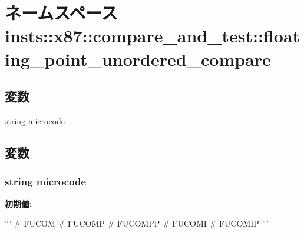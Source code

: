 \hypertarget{namespaceinsts_1_1x87_1_1compare__and__test_1_1floating__point__unordered__compare}{
\section{ネームスペース insts::x87::compare\_\-and\_\-test::floating\_\-point\_\-unordered\_\-compare}
\label{namespaceinsts_1_1x87_1_1compare__and__test_1_1floating__point__unordered__compare}
}
\subsection*{変数}
\begin{DoxyCompactItemize}
\item 
string \hyperlink{namespaceinsts_1_1x87_1_1compare__and__test_1_1floating__point__unordered__compare_a770f11a173e99389a8802f0107ed8f52}{microcode}
\end{DoxyCompactItemize}


\subsection{変数}
\hypertarget{namespaceinsts_1_1x87_1_1compare__and__test_1_1floating__point__unordered__compare_a770f11a173e99389a8802f0107ed8f52}{
\subsubsection[{microcode}]{\setlength{\rightskip}{0pt plus 5cm}string {\bf microcode}}}
\label{namespaceinsts_1_1x87_1_1compare__and__test_1_1floating__point__unordered__compare_a770f11a173e99389a8802f0107ed8f52}
{\bfseries 初期値:}
\begin{DoxyCode}
'''
# FUCOM
# FUCOMP
# FUCOMPP
# FUCOMI
# FUCOMIP
'''
\end{DoxyCode}
